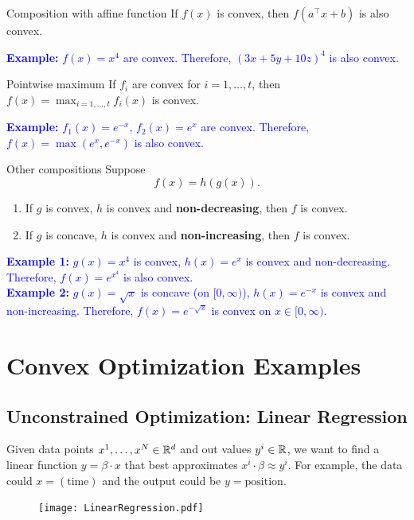 \documentclass[../open-optimization/open-optimization.tex]{subfiles}
\begin{document}
\begin{general}{Composition with affine function}{}
If $f(x)$ is convex, then $f(a^\top x + b)$ is also convex.

\textcolor{blue}{\textbf{Example: } $f(x) = x^4$ are convex.  Therefore, $(3x + 5y + 10z)^4$ is also convex.}
\end{general}

\begin{general}{Pointwise maximum}{}
If $f_i$ are convex for $i=1, \dots, t$, then $f(x) = \max_{i=1, \dots, t} f_i(x)$ is convex.

\textcolor{blue}{\textbf{Example: } $f_1(x) = e^{-x}$, $f_2(x) = e^{x}$ are convex.  Therefore, $f(x) = \max(e^x, e^{-x})$ is also convex.}
\end{general}

\begin{general}{Other compositions}{}
Suppose 
$$
f(x) = h(g(x)).
$$
\begin{enumerate}
\item If $g$ is convex, $h$ is convex and \textbf{non-decreasing}, then $f$ is convex.
\item If $g$ is concave, $h$ is convex and \textbf{non-increasing}, then $f$ is convex.
\end{enumerate}

\textcolor{blue}{\textbf{Example 1: } $g(x) = x^4$ is convex, $h(x) = e^{x}$ is convex and non-decreasing.  Therefore, $f(x) = e^{x^4}$ is also convex.}\\

\textcolor{blue}{\textbf{Example 2: } $g(x) = \sqrt{x}$ is concave (on $[0,\infty)$), $h(x) = e^{-x}$ is convex and non-increasing.  Therefore, $f(x) = e^{-\sqrt{x}}$ is convex on $x \in [0,\infty)$.}
\end{general}







\section{Convex Optimization Examples}
\subsection{Unconstrained Optimization: Linear Regression}

Given data points $x^1, \dots, x^N \in {\mathbb{R}}^d$ and out values $y^i \in {\mathbb{R}}$, we want to find a linear function $y = \beta \cdot x$ that best approximates $x^i \cdot \beta \approx y^i$.  For example, the data could $x = (\text{time})$ and the output could be $y = \text{position}$.  
\begin{figure}[H]
\begin{center}
\texttt{[image: LinearRegression.pdf]}\footnotemark
\end{center}
\end{figure}
\end{document}
